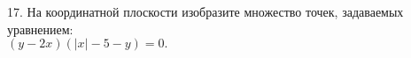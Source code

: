 17. На координатной плоскости изобразите множество точек, задаваемых уравнением:\\ $(y-2x)\left(|x|-5-y\right)=0.$\\
